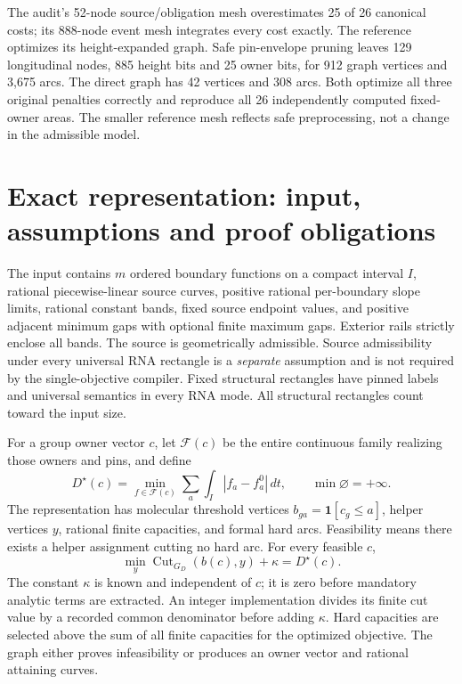 \documentclass[10pt,letterpaper]{article}
\begin{document}
The audit's 52-node source/obligation mesh overestimates 25 of 26 canonical costs; its 888-node event mesh integrates every cost exactly. The reference optimizes its height-expanded graph. Safe pin-envelope pruning leaves 129 longitudinal nodes, 885 height bits and 25 owner bits, for 912 graph vertices and 3,675 arcs. The direct graph has 42 vertices and 308 arcs. Both optimize all three original penalties correctly and reproduce all 26 independently computed fixed-owner areas. The smaller reference mesh reflects safe preprocessing, not a change in the admissible model.

\section{Exact representation: input, assumptions and proof obligations}
The input contains $m$ ordered boundary functions on a compact interval $I$, rational piecewise-linear source curves, positive rational per-boundary slope limits, rational constant bands, fixed source endpoint values, and positive adjacent minimum gaps with optional finite maximum gaps. Exterior rails strictly enclose all bands. The source is geometrically admissible. Source admissibility under every universal RNA rectangle is a \emph{separate} assumption and is not required by the single-objective compiler. Fixed structural rectangles have pinned labels and universal semantics in every RNA mode. All structural rectangles count toward the input size.

For a group owner vector $c$, let $\mathcal F(c)$ be the entire continuous family realizing those owners and pins, and define
\[
 D^\star(c)=\min_{f\in\mathcal F(c)}\sum_a\int_I|f_a-f_a^0|\,dt,
 \qquad \min\varnothing=+\infty.
\]
The representation has molecular threshold vertices $b_{ga}=\mathbf1[c_g\le a]$, helper vertices $y$, rational finite capacities, and formal hard arcs. Feasibility means there exists a helper assignment cutting no hard arc. For every feasible $c$,
\begin{equation}
 \min_y \operatorname{Cut}_{G_D}(b(c),y)+\kappa=D^\star(c).\label{eq:ownerwise}
\end{equation}
The constant $\kappa$ is known and independent of $c$; it is zero before mandatory analytic terms are extracted. An integer implementation divides its finite cut value by a recorded common denominator before adding $\kappa$. Hard capacities are selected above the sum of all finite capacities for the optimized objective. The graph either proves infeasibility or produces an owner vector and rational attaining curves.
\end{document}
